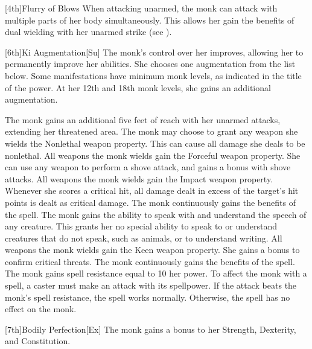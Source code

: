 [4th]{Flurry of Blows}
When attacking unarmed, the monk can attack with multiple parts of her body simultaneously.
This allows her gain the benefits of dual wielding with her unarmed strike (see ).


[6th]{Ki Augmentation}[Su]
The monk's control over her \ki improves, allowing her to permanently improve her abilities.
She chooses one \ki augmentation from the list below.
Some \ki manifestations have minimum monk levels, as indicated in the title of the power.
At her 12th and 18th monk levels, she gains an additional \ki augmentation.

The monk gains an additional five feet of reach with her unarmed attacks, extending her threatened area.
The monk may choose to grant any weapon she wields the Nonlethal weapon property.
This can cause all damage she deals to be nonlethal.
All weapons the monk wields gain the Forceful weapon property.
She can use any weapon to perform a shove attack, and gains a  bonus with shove attacks.
All weapons the monk wields gain the Impact weapon property.
Whenever she scores a critical hit, all damage dealt in excess of the target's hit points is dealt as critical damage.
The monk continuously gains the benefits of the  spell.
The monk gains the ability to speak with and understand the speech of any creature.
This grants her no special ability to speak to or understand creatures that do not speak, such as animals, or to understand writing.
All weapons the monk wields gain the Keen weapon property.
She gains a  bonus to confirm critical threats.
The monk continuously gains the benefits of the  spell.
The monk gains spell resistance equal to 10 \add her \ki power.
To affect the monk with a spell, a caster must make an attack with its spellpower.
If the attack beats the monk's spell resistance, the spell works normally.
Otherwise, the spell has no effect on the monk.

[7th]{Bodily Perfection}[Ex]
The monk gains a  bonus to her Strength, Dexterity, and Constitution.

